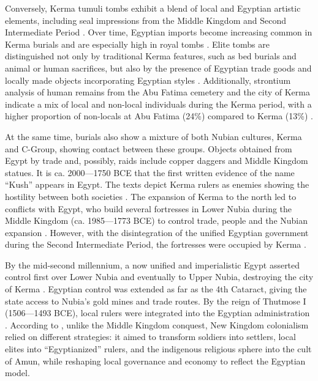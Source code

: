 Conversely, Kerma tumuli tombs exhibit a blend of local and Egyptian artistic elements, including seal impressions from the Middle Kingdom and Second Intermediate Period \parencites[p.~190-191]{Williams2020c}[p.~205-206]{bonnetCitiesKermaPnubsDokki2020}. Over time, Egyptian imports become increasing common in Kerma burials and are especially high in royal tombs \parencite[p.~216-219]{bonnetEasternCemeteryKerma2020}. Elite tombs are distinguished not only by traditional Kerma features, such as bed burials and animal or human sacrifices, but also by the presence of Egyptian trade goods and locally made objects incorporating Egyptian styles \parencite[p.~118]{emberlingEarlyKushKingdom2022}. Additionally, strontium analysis of human remains from the Abu Fatima cemetery and the city of Kerma indicate a mix of local and non-local individuals during the Kerma period, with a higher proportion of non-locals at Abu Fatima (24\%) compared to Kerma (13\%) \parencite[p.~377]{schraderIntraregional87Sr86Sr2019}.

At the same time, burials also show a mixture of both Nubian cultures, Kerma and C-Group, showing contact between these groups. Objects obtained from Egypt by trade and, possibly, raids include copper daggers and Middle Kingdom statues. It is ca. 2000—1750 BCE that the first written evidence of the name “Kush” appears in Egypt. The texts depict Kerma rulers as enemies showing the hostility between both societies \parencites[p.~130-135]{emberlingPastoralStatesComparative2014}[p.~230]{honeggerHolocenePrehistoryUpper2019a}[p.~219-220]{bonnetEasternCemeteryKerma2020}[p.~130]{emberlingEarlyKushKingdom2022}. The expansion of Kerma to the north led to conflicts with Egypt, who build several fortresses in Lower Nubia during the Middle Kingdom (ca. 1985—1773 BCE) to control trade, people and the Nubian expansion \parencite[p.271]{bestockEgyptianFortressesColonization2020}. However, with the disintegration of the unified Egyptian government during the Second Intermediate Period, the fortresses were occupied by Kerma \parencites[p.~300]{meurerNubiansEgyptEarly2020}[p.~122]{emberlingEarlyKushKingdom2022}.

By the mid-second millennium, a now unified and imperialistic Egypt asserted control first over Lower Nubia and eventually to Upper Nubia, destroying the city of Kerma \parencite[p.~78]{edwardsNubianArchaeologySudan2004}. Egyptian control was extended as far as the 4th Cataract, giving the state access to Nubia’s gold mines and trade routes. By the reign of Thutmose I (1506—1493 BCE), local rulers were integrated into the Egyptian administration \parencites[p.~76]{morkotBlackPharaohsEgypts2000}[p.~99]{torokKingdomKushHandbook1997}. According to \textcite[p.~103-104]{morrisAncientEgyptianImperialism2018}, unlike the Middle Kingdom conquest, New Kingdom colonialism relied on different strategies: it aimed to transform soldiers into settlers, local elites into “Egyptianized” rulers, and the indigenous religious sphere into the cult of Amun, while reshaping local governance and economy to reflect the Egyptian model.

